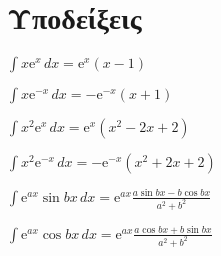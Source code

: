 \section*{Υποδείξεις}

\begin{myitemize}
  \item $ \displaystyle\int x \mathrm{e}^{x} \,{dx} = \mathrm{e}^{x} (x-1) $
  \item $ \displaystyle\int x \mathrm{e}^{-x} \,{dx} = - \mathrm{e}^{-x} (x+1) $ 
  \item $ \displaystyle\int x^{2} \mathrm{e}^{x} \,{dx} = \mathrm{e}^{x} (x^{2}-2x+2) $
  \item $ \displaystyle\int x^{2} \mathrm{e}^{-x} \,{dx} = 
    -\mathrm{e}^{-x} (x^{2}+2x+2) $
  \item $ \displaystyle\int \mathrm{e}^{ax} \sin{bx} \,{dx} = 
    \mathrm{e}^{ax} \frac{a \sin{bx} - b \cos{bx}}{a^{2}+b^{2}} $
  \item $ \displaystyle\int \mathrm{e}^{ax} \cos{bx} \,{dx} = 
    \mathrm{e}^{ax} \frac{a \cos{bx} + b \sin{bx}}{a^{2}+b^{2}} $
\end{myitemize}


